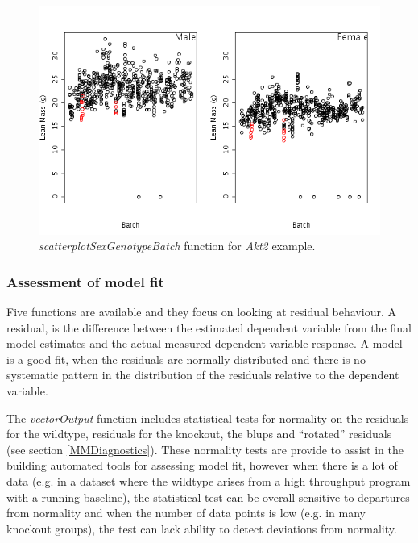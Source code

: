 \documentclass[12pt,a4paper]{article}
\begin{document}
\begin{figure}[H]%
\centerline{\includegraphics[scale=0.5]{cs1_scatterplotSexGenotypeBatch.png}}
\caption{\textit{scatterplotSexGenotypeBatch} function for \textit{Akt2} example.}\label{fig:16}
\end{figure}

\subsubsection{Assessment of model fit}

Five functions are available and they focus on looking at residual behaviour. 
A residual, is the difference between the estimated dependent variable from the final model estimates and the actual measured dependent variable response. 
A model is a good fit, when the residuals are normally distributed and there is no systematic pattern in the distribution of the residuals relative to the dependent variable. 

The \textit{vectorOutput} function includes statistical tests for normality on the residuals for the wildtype, residuals for the knockout, the blups and ``rotated'' residuals (see section \ref{MMDiagnostics}). 
These normality tests are provide to assist in the building automated tools for assessing model fit, 
however when there is a lot of data (e.g. in a dataset where the wildtype arises from a high throughput program with a running baseline), 
the statistical test can be overall sensitive to departures from normality and when the number of data points is low (e.g. in many knockout groups), the test can lack ability to detect deviations from normality. 
\end{document}
